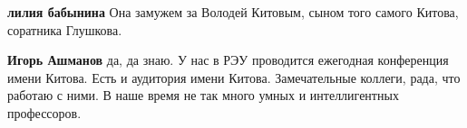 \begin{itemize}
\begin{itemize}
\textbf{лилия бабынина} Она замужем за Володей Китовым, сыном того самого Китова, соратника Глушкова.

 
\textbf{Игорь Ашманов} да, да знаю. У нас в РЭУ проводится ежегодная конференция имени Китова. Есть и аудитория имени Китова. Замечательные коллеги, рада, что работаю с ними. В наше время не так много умных и интеллигентных профессоров.
\end{itemize}

\end{itemize}

